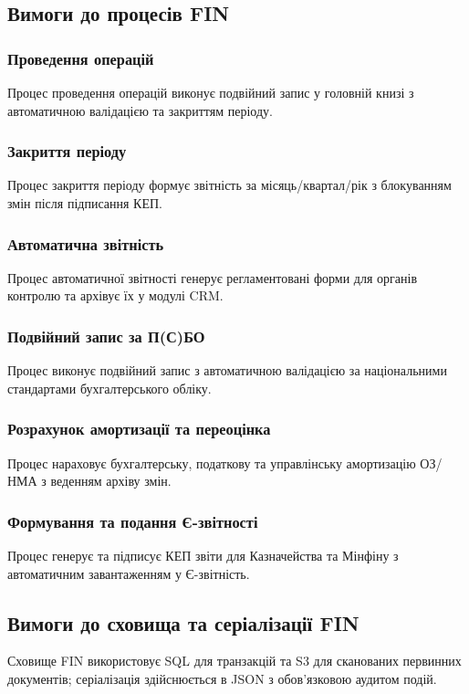 \documentclass{article}
\begin{document}
\newpage
\subsection{Вимоги до процесів FIN}

\subsubsection{Проведення операцій}
Процес проведення операцій виконує подвійний запис у головній книзі з автоматичною валідацією та закриттям періоду.

\subsubsection{Закриття періоду}
Процес закриття періоду формує звітність за місяць/квартал/рік з блокуванням змін після підписання КЕП.

\subsubsection{Автоматична звітність}
Процес автоматичної звітності генерує регламентовані форми для органів контролю та архівує їх у модулі CRM.

\subsubsection{Подвійний запис за П(С)БО}
Процес виконує подвійний запис з автоматичною валідацією за національними стандартами бухгалтерського обліку.

\subsubsection{Розрахунок амортизації та переоцінка}
Процес нараховує бухгалтерську, податкову та управлінську амортизацію ОЗ/НМА з веденням архіву змін.

\subsubsection{Формування та подання Є-звітності}
Процес генерує та підписує КЕП звіти для Казначейства та Мінфіну з автоматичним завантаженням у Є-звітність.

\subsection{Вимоги до сховища та серіалізації FIN}
Сховище FIN використовує SQL для транзакцій та S3 для сканованих первинних документів; серіалізація здійснюється в JSON з обов’язковою аудитом подій.
\end{document}
